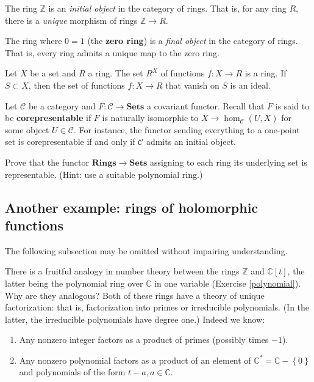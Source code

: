 \begin{exercise}
\label{integersinitial}
The ring $\mathbb{Z}$ is an \emph{initial object} in the category of rings.
That is, for any ring $R$, there is a \emph{unique} morphism of rings
$\mathbb{Z} \to R$.
\end{exercise} 

\begin{exercise} 
The ring where $0=1$ (the \textbf{zero ring}) is a \emph{final object} in the category of rings. That
is, every ring admits a unique map to the zero ring.	
\end{exercise} 

\begin{exercise} 
Let $X$ be a set and $R$ a ring. The set $R^X$ of functions $f:X \to R$ is a
ring. If $S \subset X$, then the set of functions $f: X \to R$ that vanish on
$S$ is an ideal.
\end{exercise}

\begin{exercise}
\label{corepresentable}
Let $\mathcal{C}$ be a category and $F: \mathcal{C} \to \mathbf{Sets}$  a
covariant functor. Recall that $F$ is said to be \textbf{corepresentable} if
$F$ is naturally isomorphic to $X \to \hom_{\mathcal{C}}(U, X)$ for some
object $U \in \mathcal{C}$. For instance, the functor sending everything to a
one-point set is corepresentable if and only if $\mathcal{C}$ admits an
initial object.

Prove that the functor  $\mathbf{Rings} \to \mathbf{Sets}$ assigning to each ring its underlying set is
representable. (Hint: use a suitable polynomial ring.)
\end{exercise} 

\subsection{Another example: rings of holomorphic functions}

The following subsection may be omitted without impairing understanding.

There is a fruitful analogy in number theory between the rings $\mathbb{Z}$ and
$\mathbb{C}[t]$, the latter being the polynomial ring over $\mathbb{C}$ in one
variable (Exercise \ref{polynomial}).  Why are they analogous? Both of these rings have a theory of unique
factorization:  that is, factorization into primes or irreducible polynomials. (In the
latter, the irreducible polynomials have degree one.)
Indeed we know:
\begin{enumerate}
\item Any nonzero integer factors as a product of primes (possibly times $-1$). 
\item Any  nonzero polynomial factors as a product of an element of
$\mathbb{C}^* =\mathbb{C} - \left\{0\right\}$ and polynomials of the form $t -
a, a \in \mathbb{C}$.
\end{enumerate}


